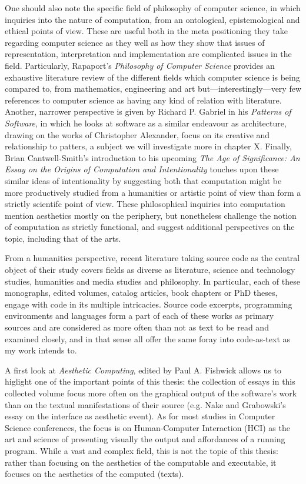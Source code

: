 One should also note the specific field of philosophy of computer science, in which inquiries into the nature of computation, from an ontological, epistemological and ethical points of view. These are useful both in the meta positioning they take regarding computer science as they well as how they show that issues of representation, interpretation and implementation are complicated issues in the field. Particularly, Rapaport's \emph{Philosophy of Computer Science} provides an exhaustive literature review of the different fields which computer science is being compared to, from mathematics, engineering and art but—interestingly—very few references to computer science as having any kind of relation with literature\cite{rapaport_philosophy_2005}. Another, narrower perspective is given by Richard P. Gabriel in his \emph{Patterns of Software}, in which he looks at software as a similar endeavour as architecture, drawing on the works of Christopher Alexander, focus on its creative and relationship to patters, a subject we will investigate more in chapter X. Finally, Brian Cantwell-Smith's introduction to his upcoming \emph{The Age of Significance: An Essay on the Origins of Computation and Intentionality} touches upon these similar ideas of intentionality by suggesting both that computation might be more productively studied from a humanities or artistic point of view than form a strictly scientifc point of view\cite{smith_origin_1998}. These philosophical inquiries into computation mention aesthetics mostly on the periphery, but nonetheless challenge the notion of computation as strictly functional, and suggest additional perspectives on the topic, including that of the arts.

\vspace*{1\baselineskip}

From a humanities perspective, recent literature taking source code as the central object of their study covers fields as diverse as literature, science and technology studies, humanities and media studies and philosophy. In particular, each of these monographs, edited volumes, catalog articles, book chapters or PhD theses, engage with code in its multiple intricacies. Source code excerpts, programming environments and languages form a part of each of these works as primary sources and are considered as more often than not as text to be read and examined closely, and in that sense all offer the same foray into code-as-text as my work intends to.

A first look at \emph{Aesthetic Computing}, edited by Paul A. Fishwick allows us to higlight one of the important points of this thesis: the collection of essays in this collected volume focus more often on the graphical output of the software's work than on the textual manifestations of their source (e.g. Nake and Grabowski's essay on the interface as aesthetic event)\cite{fishwick_aesthetic_2001}. As for most studies in Computer Science conferences, the focus is on Human-Computer Interaction (HCI) as the art and science of presenting visually the output and affordances of a running program. While a vast and complex field, this is not the topic of this thesis: rather than focusing on the aesthetics of the computable and executable, it focuses on the aesthetics of the computed (texts).

